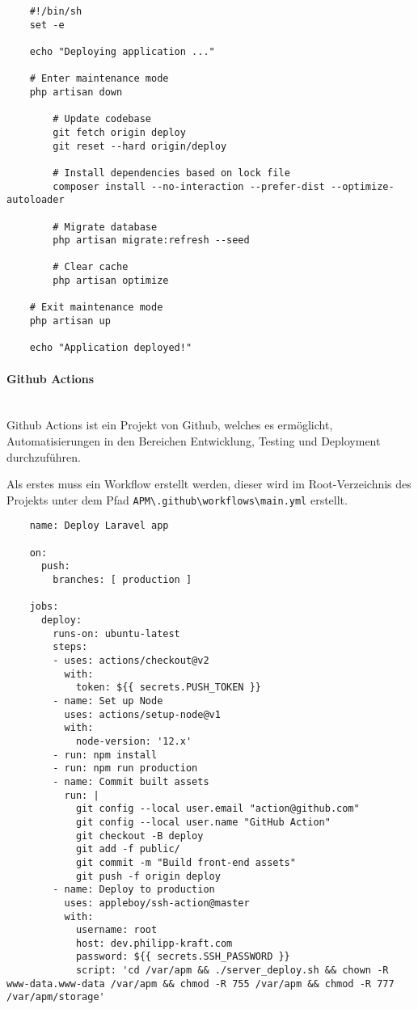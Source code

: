 \begin{longlisting}
  \begin{verbatim}
    #!/bin/sh
    set -e
    
    echo "Deploying application ..."
    
    # Enter maintenance mode
    php artisan down
        
        # Update codebase
        git fetch origin deploy
        git reset --hard origin/deploy
    
        # Install dependencies based on lock file
        composer install --no-interaction --prefer-dist --optimize-autoloader
    
        # Migrate database
        php artisan migrate:refresh --seed
    
        # Clear cache
        php artisan optimize
    
    # Exit maintenance mode
    php artisan up
    
    echo "Application deployed!"
  \end{verbatim}
  \caption{Server Deploy Script}
\end{longlisting}

\paragraph{Github Actions}\mbox{}\\
Github Actions ist ein Projekt von Github, welches es ermöglicht,
Automatisierungen in den Bereichen Entwicklung, Testing und Deployment
durchzuführen.

Als erstes muss ein Workflow erstellt werden, dieser wird im Root-Verzeichnis
des Projekts unter dem Pfad \verb|APM\.github\workflows\main.yml| erstellt.

\begin{longlisting}
  \begin{verbatim}
    name: Deploy Laravel app

    on:
      push:
        branches: [ production ]
    
    jobs:
      deploy:
        runs-on: ubuntu-latest
        steps:
        - uses: actions/checkout@v2
          with:
            token: ${{ secrets.PUSH_TOKEN }}
        - name: Set up Node
          uses: actions/setup-node@v1
          with:
            node-version: '12.x'
        - run: npm install
        - run: npm run production
        - name: Commit built assets
          run: |
            git config --local user.email "action@github.com"
            git config --local user.name "GitHub Action"
            git checkout -B deploy
            git add -f public/
            git commit -m "Build front-end assets"
            git push -f origin deploy
        - name: Deploy to production
          uses: appleboy/ssh-action@master
          with:
            username: root
            host: dev.philipp-kraft.com
            password: ${{ secrets.SSH_PASSWORD }}
            script: 'cd /var/apm && ./server_deploy.sh && chown -R www-data.www-data /var/apm && chmod -R 755 /var/apm && chmod -R 777 /var/apm/storage' 
  \end{verbatim}
  \caption{main.yml}
\end{longlisting}

